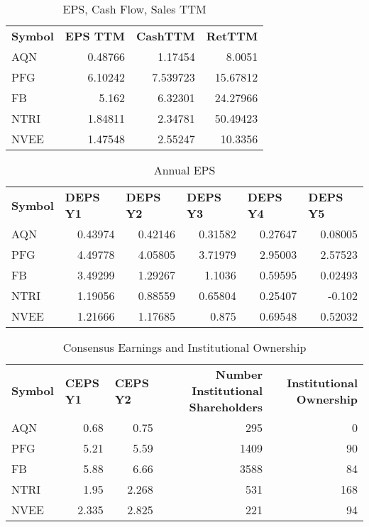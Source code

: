\documentclass{article}
\begin{document}
\begin{table}[htbp]
  \caption{EPS, Cash Flow, Sales TTM}
   \begin{tabular}{lrrr}
    \textbf{Symbol} & \multicolumn{1}{l}{\textbf{EPS TTM}} & \multicolumn{1}{l}{\textbf{CashTTM}} & \multicolumn{1}{l}{\textbf{RetTTM}} \\
    AQN   & 0.48766 & 1.17454 & 8.0051 \\
    PFG   & 6.10242 & 7.539723 & 15.67812 \\
    FB    & 5.162 & 6.32301 & 24.27966 \\
    NTRI  & 1.84811 & 2.34781 & 50.49423 \\
    NVEE  & 1.47548 & 2.55247 & 10.3356 \\
    \end{tabular}%
  \label{tab:addlabel}%
\end{table}%

\begin{table}[htbp]
  \caption{Annual EPS}
      \begin{tabular}{lrrrrr}
    \textbf{Symbol} & \multicolumn{1}{l}{\textbf{DEPS Y1}} & \multicolumn{1}{l}{\textbf{DEPS Y2}} & \multicolumn{1}{l}{\textbf{DEPS Y3}} & \multicolumn{1}{l}{\textbf{DEPS Y4}} & \multicolumn{1}{l}{\textbf{DEPS Y5}} \\
    AQN   & 0.43974 & 0.42146 & 0.31582 & 0.27647 & 0.08005 \\
    PFG   & 4.49778 & 4.05805 & 3.71979 & 2.95003 & 2.57523 \\
    FB    & 3.49299 & 1.29267 & 1.1036 & 0.59595 & 0.02493 \\
    NTRI  & 1.19056 & 0.88559 & 0.65804 & 0.25407 & -0.102 \\
    NVEE  & 1.21666 & 1.17685 & 0.875 & 0.69548 & 0.52032 \\
    \end{tabular}%
  \label{tab:addlabel}%
\end{table}%

\begin{table}[htbp]
  \caption{Consensus Earnings and Institutional Ownership}
    \begin{tabular}{lrrrr}
    \textbf{Symbol} & \multicolumn{1}{l}{\textbf{CEPS Y1}} & \multicolumn{1}{l}{\textbf{CEPS Y2}} & \multicolumn{1}{p{4.215em}}{\textbf{Number Institutional Shareholders}} & \multicolumn{1}{p{4.215em}}{\textbf{Institutional Ownership}} \\
    AQN   & 0.68  & 0.75  & 295   & 0 \\
    PFG   & 5.21  & 5.59  & 1409  & 90 \\
    FB    & 5.88  & 6.66  & 3588  & 84 \\
    NTRI  & 1.95  & 2.268 & 531   & 168 \\
    NVEE  & 2.335 & 2.825 & 221   & 94 \\
    \end{tabular}%
  \label{tab:addlabel}%
\end{table}%
\end{document}
